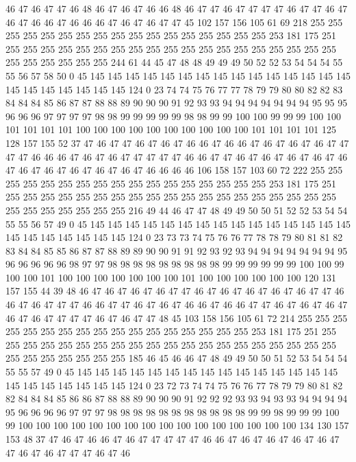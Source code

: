 46 47 46 47 47 46 48 46 47 46 47 46 46 48 46 47 47 46 47 47
47 47 46 47 47 46 47 46 47 46 46 47 46 46 46 47 46 47 46 47
47 45 102 157 156 105 61 69 218 255 255 255 255 255 255 255 255 255 255 255
255 255 255 255 255 255 253 181 175 251 255 255 255 255 255 255 255 255 255 255
255 255 255 255 255 255 255 255 255 255 255 255 255 255 255 244 61 44 45 47
48 48 49 49 49 50 52 52 53 54 54 54 55 55 56 57 58 50 0 45
145 145 145 145 145 145 145 145 145 145 145 145 145 145 145 145 145 145 145 145
145 145 124 0 23 74 74 75 76 77 77 78 79 79 80 80 82 82 83 84
84 84 85 86 87 87 88 88 89 90 90 90 91 92 93 93 94 94 94 94
94 94 94 95 95 95 96 96 96 97 97 97 97 98 98 99 99 99 99 99
98 98 99 99 100 100 99 99 99 100 100 101 101 101 101 100 100 100 100 100
100 100 100 100 100 101 101 101 101 125 128 157 155 52 37 47 46 47 47 46
47 46 47 46 46 47 46 46 47 46 47 46 47 46 47 47 47 47 46 46
46 47 46 47 46 47 47 47 47 47 46 46 47 47 46 47 46 47 46 47
46 47 46 47 46 47 46 47 46 47 46 47 46 47 46 46 46 46 106 158
157 103 60 72 222 255 255 255 255 255 255 255 255 255 255 255 255 255 255 255
255 255 253 181 175 251 255 255 255 255 255 255 255 255 255 255 255 255 255 255
255 255 255 255 255 255 255 255 255 255 255 255 216 49 44 46 47 47 48 49
49 50 50 51 52 52 53 54 54 55 55 56 57 49 0 45 145 145 145 145
145 145 145 145 145 145 145 145 145 145 145 145 145 145 145 145 145 145 124 0
23 73 73 74 75 76 76 77 78 78 79 80 81 81 82 83 84 84 85 85
86 87 87 88 89 89 90 90 91 91 92 93 92 93 94 94 94 94 94 94
94 95 96 96 96 96 96 98 97 97 98 98 98 98 98 98 98 98 98 99
99 99 99 99 99 100 100 99 100 100 101 100 100 100 100 100 100 100 101 100
100 100 100 100 100 120 131 157 155 44 39 48 46 47 46 47 46 47 46 47
47 46 47 46 47 46 47 46 47 46 47 47 46 46 47 46 47 47 47 46
46 47 47 46 47 46 47 46 46 47 46 46 47 47 46 47 46 47 46 47
46 47 46 47 47 47 47 46 47 46 47 47 48 45 103 158 156 105 61 72
214 255 255 255 255 255 255 255 255 255 255 255 255 255 255 255 255 255 253 181
175 251 255 255 255 255 255 255 255 255 255 255 255 255 255 255 255 255 255 255
255 255 255 255 255 255 255 255 255 185 46 45 46 46 47 48 49 49 50 50
51 52 53 54 54 54 55 55 57 49 0 45 145 145 145 145 145 145 145 145
145 145 145 145 145 145 145 145 145 145 145 145 145 145 124 0 23 72 73 74
74 75 76 76 77 78 79 79 80 81 82 82 84 84 84 85 86 86 87 88
88 89 90 90 90 91 92 92 92 93 93 94 93 93 94 94 94 94 95 96
96 96 96 97 97 97 98 98 98 98 98 98 98 98 98 98 98 99 99 98
99 99 99 100 99 100 100 100 100 100 100 100 100 100 100 100 100 100 100 100
100 134 130 157 153 48 37 47 46 47 46 46 47 46 47 47 47 47 47 46
46 47 46 47 46 47 46 47 46 47 47 46 47 46 47 47 47 46 47 46
